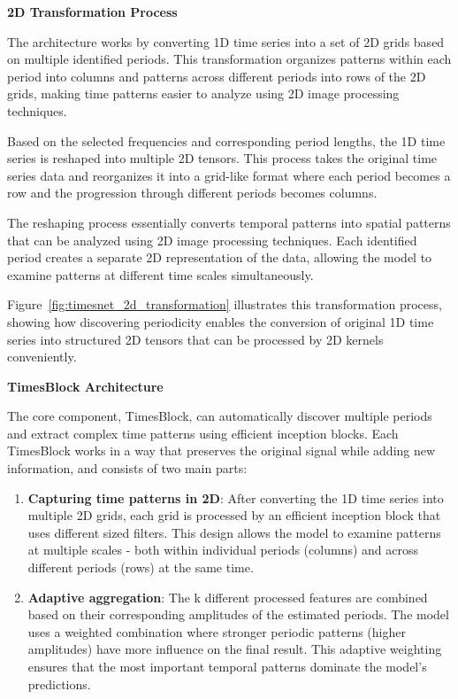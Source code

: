 \textbf{2D Transformation Process}

The architecture works by converting 1D time series into a set of 2D grids based on multiple identified periods. This transformation organizes patterns within each period into columns and patterns across different periods into rows of the 2D grids, making time patterns easier to analyze using 2D image processing techniques. 

Based on the selected frequencies and corresponding period lengths, the 1D time series is reshaped into multiple 2D tensors. This process takes the original time series data and reorganizes it into a grid-like format where each period becomes a row and the progression through different periods becomes columns.

The reshaping process essentially converts temporal patterns into spatial patterns that can be analyzed using 2D image processing techniques. Each identified period creates a separate 2D representation of the data, allowing the model to examine patterns at different time scales simultaneously.

Figure~\ref{fig:timesnet_2d_transformation} illustrates this transformation process, showing how discovering periodicity enables the conversion of original 1D time series into structured 2D tensors that can be processed by 2D kernels conveniently. 

\textbf{TimesBlock Architecture}

The core component, TimesBlock, can automatically discover multiple periods and extract complex time patterns using efficient inception blocks. Each TimesBlock works in a way that preserves the original signal while adding new information, and consists of two main parts:

\begin{enumerate}
\item \textbf{Capturing time patterns in 2D}: After converting the 1D time series into multiple 2D grids, each grid is processed by an efficient inception block that uses different sized filters. This design allows the model to examine patterns at multiple scales - both within individual periods (columns) and across different periods (rows) at the same time.

\item \textbf{Adaptive aggregation}: The k different processed features are combined based on their corresponding amplitudes of the estimated periods. The model uses a weighted combination where stronger periodic patterns (higher amplitudes) have more influence on the final result. This adaptive weighting ensures that the most important temporal patterns dominate the model's predictions.
\end{enumerate}

